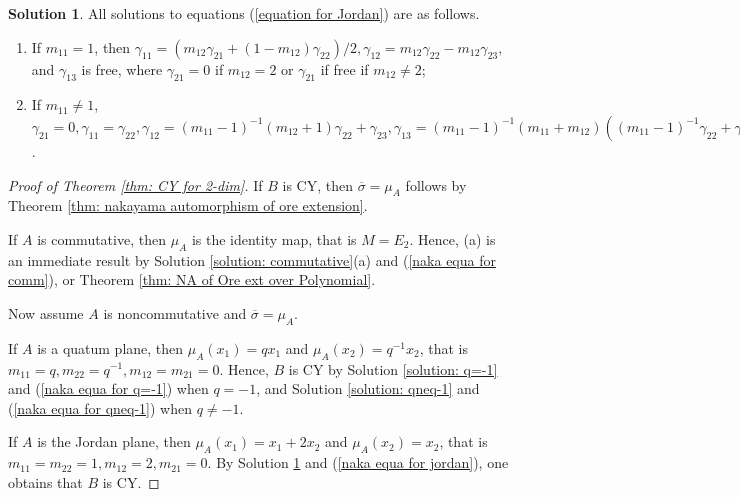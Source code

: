 \documentclass[a4paper,10pt]{amsart}
\theoremstyle{definition}
\newtheorem{solution}[theorem]{Solution}
\numberwithin{equation}{section}
\begin{document}
\begin{solution}\label{solution: Jordan}
All solutions to equations (\ref{equation for Jordan}) are as follows.
\begin{enumerate}
\item If $m_{11}=1$, then
$
\gamma_{11}=(m_{12}\gamma_{21}+(1-m_{12})\gamma_{22})/2,\gamma_{12}=m_{12}\gamma_{22}-m_{12}\gamma_{23},
$ and $\gamma_{13}$ is free, where $\gamma_{21}=0$ if $m_{12}=2$ or $\gamma_{21}$ if free if $m_{12}\neq 2$;%

\item If $m_{11}\neq 1$, $\gamma_{21}=0,\gamma_{11}=\gamma_{22},\gamma_{12}=(m_{11}-1)^{-1}(m_{12}+1)\gamma_{22}+\gamma_{23},
    \gamma_{13}=(m_{11}-1)^{-1}(m_{11}+m_{12})((m_{11}-1)^{-1}\gamma_{22}+\gamma_{23})$. %
\end{enumerate}
\end{solution}



\begin{proof}[Proof of Theorem \ref{thm: CY for 2-dim}]
If $B$ is CY, then $\overline{\sigma}=\mu_A$ follows by Theorem \ref{thm: nakayama automorphism of ore extension}.

If $A$ is commutative, then $\mu_A$ is the identity map, that is $M=E_2$. Hence, (a) is an immediate result by Solution \ref{solution: commutative}(a) and (\ref{naka equa for comm}), or Theorem \ref{thm: NA of Ore ext over Polynomial}.

Now assume $A$ is noncommutative and  $\overline{\sigma}=\mu_A$.

If $A$ is a quatum plane, then $\mu_A(x_1)=qx_1$ and $\mu_A(x_2)=q^{-1}x_2$, that is $m_{11}=q,m_{22}=q^{-1},m_{12}=m_{21}=0$. Hence, $B$ is CY by Solution \ref{solution: q=-1} and (\ref{naka equa for q=-1}) when $q=-1$, and Solution \ref{solution: qneq-1} and (\ref{naka equa for qneq-1}) when $q\neq-1$.

If $A$ is the Jordan plane, then $\mu_A(x_1)=x_1+2x_2$ and $\mu_A(x_2)=x_2$, that is $m_{11}=m_{22}=1,m_{12}=2,m_{21}=0$. By Solution \ref{solution: Jordan} and (\ref{naka equa for jordan}), one obtains that $B$ is CY.
\end{proof}
\end{document}
